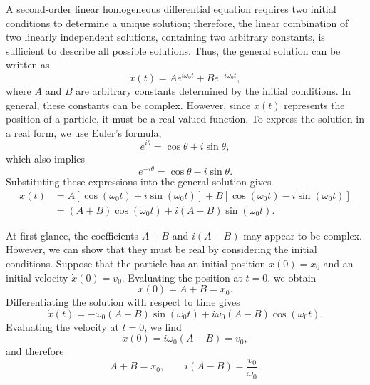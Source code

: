 \documentclass[../main.tex]{subfiles}
\begin{document}
A second-order linear homogeneous differential equation requires two initial conditions to determine a unique solution; therefore, the linear combination of two linearly independent solutions, containing two arbitrary constants, is sufficient to describe all possible solutions. Thus, the general solution can be written as
\begin{equation}
    x(t)=Ae^{i\omega_0 t}+Be^{-i\omega_0 t},
\end{equation}
where $A$ and $B$ are arbitrary constants determined by the initial conditions. In general, these constants can be complex. However, since $x(t)$ represents the position of a particle, it must be a real-valued function. To express the solution in a real form, we use Euler's formula,
\begin{equation}
    e^{i\theta}=\cos\theta+i\sin\theta,
\end{equation}
which also implies
\begin{equation}
    e^{-i\theta}=\cos\theta-i\sin\theta.
\end{equation}
Substituting these expressions into the general solution gives
\begin{align}
    x(t)
    &=A\left[\cos(\omega_0 t)+i\sin(\omega_0 t)\right]
    +B\left[\cos(\omega_0 t)-i\sin(\omega_0 t)\right]
    \nonumber\\
    &=(A+B)\cos(\omega_0 t)
    +i(A-B)\sin(\omega_0 t).
\end{align}

At first glance, the coefficients $A+B$ and $i(A-B)$ may appear to be complex. However, we can show that they must be real by considering the initial conditions. Suppose that the particle has an initial position $x(0)=x_0$ and an initial velocity $\dot{x}(0)=v_0$. Evaluating the position at $t=0$, we obtain
\begin{equation}
    x(0)=A+B=x_0.
\end{equation}
Differentiating the solution with respect to time gives
\begin{equation}
    \dot{x}(t)
    =-\omega_0(A+B)\sin(\omega_0 t)
    +i\omega_0(A-B)\cos(\omega_0 t).
\end{equation}
Evaluating the velocity at $t=0$, we find
\begin{equation}
    \dot{x}(0)=i\omega_0(A-B)=v_0,
\end{equation}
and therefore
\begin{equation}
    A+B=x_0,
    \qquad
    i(A-B)=\frac{v_0}{\omega_0}.
\end{equation}
\end{document}
